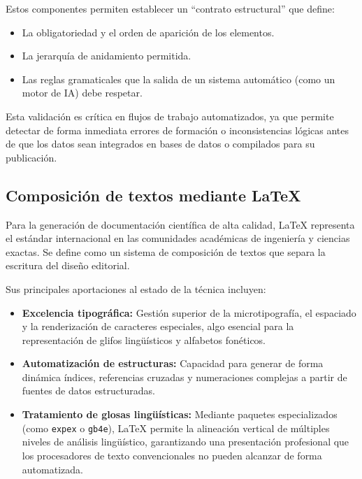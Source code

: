 Estos componentes permiten establecer un ``contrato estructural'' que define:

\begin{itemize}
    \item La obligatoriedad y el orden de aparición de los elementos.
    \item La jerarquía de anidamiento permitida.
    \item Las reglas gramaticales que la salida de un sistema automático (como un motor de IA) debe respetar.
\end{itemize}

Esta validación es crítica en flujos de trabajo automatizados, ya que permite detectar de forma inmediata errores de formación o inconsistencias lógicas antes de que los datos sean integrados en bases de datos o compilados para su publicación.

\subsection{Composición de textos mediante \LaTeX}

Para la generación de documentación científica de alta calidad, \LaTeX{} representa el estándar internacional en las comunidades académicas de ingeniería y ciencias exactas. Se define como un sistema de composición de textos que separa la escritura del diseño editorial.

Sus principales aportaciones al estado de la técnica incluyen:

\begin{itemize}
    \item \textbf{Excelencia tipográfica:} Gestión superior de la microtipografía, el espaciado y la renderización de caracteres especiales, algo esencial para la representación de glifos lingüísticos y alfabetos fonéticos.
    
    \item \textbf{Automatización de estructuras:} Capacidad para generar de forma dinámica índices, referencias cruzadas y numeraciones complejas a partir de fuentes de datos estructuradas.
    
    \item \textbf{Tratamiento de glosas lingüísticas:} Mediante paquetes especializados (como \texttt{expex} o \texttt{gb4e}), \LaTeX{} permite la alineación vertical de múltiples niveles de análisis lingüístico, garantizando una presentación profesional que los procesadores de texto convencionales no pueden alcanzar de forma automatizada.
\end{itemize}


